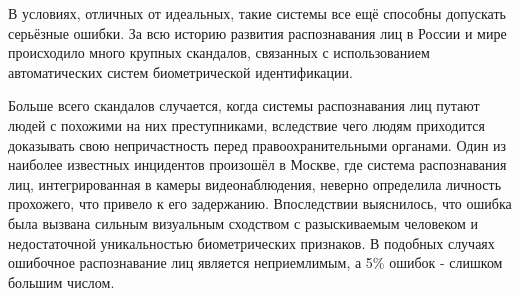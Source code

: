 В условиях, отличных от идеальных, такие системы все ещё способны допускать серьёзные ошибки. За всю историю развития распознавания лиц в России и мире происходило много крупных скандалов, связанных с использованием автоматических систем биометрической идентификации. 

Больше всего скандалов случается, когда системы распознавания лиц путают людей с похожими на них преступниками, вследствие чего людям приходится доказывать свою непричастность перед правоохранительными органами. Один из наиболее известных инцидентов произошёл в Москве, где система распознавания лиц, интегрированная в камеры видеонаблюдения, неверно определила личность прохожего, что привело к его задержанию. Впоследствии выяснилось, что ошибка была вызвана сильным визуальным сходством с разыскиваемым человеком и недостаточной уникальностью биометрических признаков.\cite{moscow} В подобных случаях ошибочное распознавание лиц является неприемлимым, а 5\% ошибок - слишком большим числом.

	